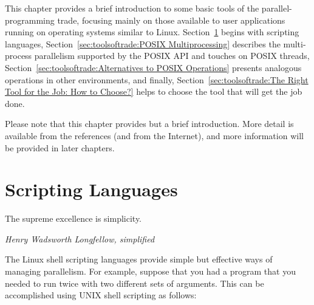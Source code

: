 
%

This chapter provides a brief introduction to some basic tools of the
parallel-programming trade, focusing mainly on those available to
user applications running on operating systems similar to Linux.
Section~\ref{sec:toolsoftrade:Scripting Languages} begins with
scripting languages,
Section~\ref{sec:toolsoftrade:POSIX Multiprocessing}
describes the multi-process parallelism supported by the POSIX API and
touches on POSIX threads,
Section~\ref{sec:toolsoftrade:Alternatives to POSIX Operations}
presents analogous operations in other environments, and finally,
Section~\ref{sec:toolsoftrade:The Right Tool for the Job: How to Choose?}
helps to choose the tool that will get the job done.

\QuickQuizEnd

Please note that this chapter provides but a brief introduction.
More detail is available from the references (and from the Internet),
and more information will be provided in later chapters.

\section{Scripting Languages}
\label{sec:toolsoftrade:Scripting Languages}
%
\epigraph{The supreme excellence is simplicity.}
	 {\emph{Henry Wadsworth Longfellow, simplified}}

The Linux shell scripting languages provide simple but effective ways
of managing parallelism.
For example, suppose that you had a program 
that you needed to run twice with two different sets of arguments.
This can be accomplished using UNIX shell scripting as follows:



